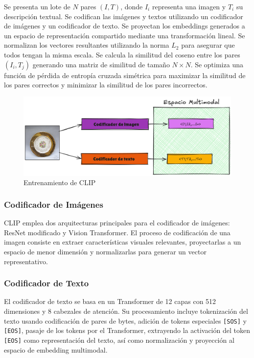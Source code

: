 				 Se presenta un lote de $N$ pares $(I, T)$, donde $I_i$ representa una imagen y $T_i$ su descripción textual.
				 Se codifican las imágenes y textos utilizando un codificador de imágenes y un codificador de texto.
				 Se proyectan los embeddings generados a un espacio de representación compartido mediante una transformación lineal.
				 Se normalizan los vectores resultantes utilizando la norma $L_2$ para asegurar que todos tengan la misma escala.
				 Se calcula la similitud del coseno entre los pares $(I_i, T_j)$ generando una matriz de similitud de tamaño $N \times N$.
				 Se optimiza una función de pérdida de entropía cruzada simétrica para maximizar la similitud de los pares correctos y minimizar la similitud de los pares incorrectos.

				\begin{figure}[h] 
					\centering
					\includegraphics[width=1\textwidth]{Graphics/train_clip} 
					\caption{Entrenamiento de CLIP}
					\label{fig:CLIP}
				\end{figure}

		\subsubsection*{Codificador de Imágenes}
			CLIP emplea dos arquitecturas principales para el codificador de imágenes: ResNet modificado y Vision Transformer.
			El proceso de codificación de una imagen consiste en extraer características visuales relevantes, proyectarlas a un espacio de menor dimensión y normalizarlas para generar un vector representativo.

		\subsubsection*{Codificador de Texto}
			El codificador de texto se basa en un Transformer de 12 capas con 512 dimensiones y 8 cabezales de atención. Su procesamiento incluye tokenización del texto usando codificación de pares de bytes, adición de tokens especiales \texttt{[SOS]} y \texttt{[EOS]}, pasaje de los tokens por el Transformer, extrayendo la activación del token \texttt{[EOS]} como representación del texto, así como normalización y proyección al espacio de embedding multimodal.

